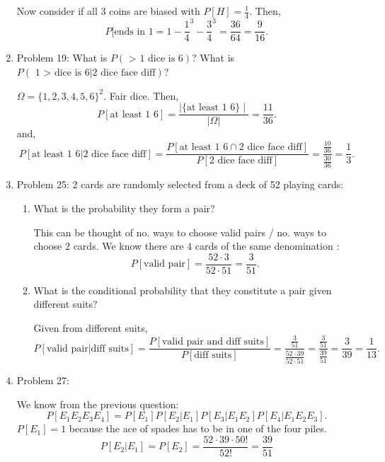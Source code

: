 \documentclass[a4paper]{article}
\begin{document}
\begin{enumerate}
\begin{note}
      Now consider if all 3 coins are biased with  $P[H] = \frac{1}{4}$. Then,
      \[
        P[\text{ends in 1} = 1 - \frac{1}{4}^{3} - \frac{3}{4}^{3} = \frac{36}{64} = \frac{9}{16}
      .\] 
    \end{note}
  \item Problem 19: What is $P(\text{ > 1 dice is 6})$? What is  $P(\text{ 1 > dice is 6} | \text{2 dice face diff})$?
    \begin{note}
      $\Omega = \{1,2,3,4,5,6\}^{2}$. Fair dice. Then,
      \[
        P[\text{at least 1 6}] = \frac{\mid \{\text{at least 1 6} \}\mid }{|\Omega|} = \frac{11}{36}
      .\] 
      and,
      \[
        P[\text{at least 1 6} | \text{2 dice face diff}] = \frac{P[\text{at least 1 6} \cap \text{2 dice face diff}]}{
        P[\text{2 dice face diff}]} = \frac{\frac{10}{36}}{\frac{30}{36}} = \frac{1}{3}
      .\] 
    \end{note}
  \item Problem 25: 2 cards are randomly selected from a deck of 52 playing cards:
    \begin{enumerate}
      \item What is the probability they form a pair?
        \begin{note}
          This can be thought of no. ways to choose valid pairs / no. ways to choose 2 cards. We know there 
          are $4$ cards of the same denomination :
          \[
            P[\text{valid pair}] = \frac{52 \cdot 3}{52 \cdot 51} = \frac{3}{51}
          .\] 
        \end{note}
      \item What is the conditional probability that they constitute a pair given different suits?
        \begin{note}
          Given from different suits,
          \[
            P[\text{valid pair} | \text{diff suits}] = \frac{P[\text{valid pair and diff suits}]}{P[\text{diff suits}]} 
            = \frac{\frac{3}{51}}{\frac{52 \cdot 39}{52 \cdot 51}} = \frac{\frac{3}{51}}{\frac{39}{51}} = \frac{3}{39} = \frac{1}{13}
          .\] 
        \end{note}
    \end{enumerate}
  \item Problem 27:
    \begin{note}
      We know from the previous question:
      \[
        P[E_1 E_2 E_3 E_4] = P[E_1] P[E_2|E_1] P[E_3|E_1 E_2] P[E_4 | E_1 E_2 E_3]
      .\] 
      $P[E_1]=1$ because the ace of spades has to be in one of the four piles.  
       \[
         P[E_2|E_1] = P[E_2] = \frac{52 \cdot 39 \cdot 50!}{52!} = \frac{39}{51} 
\]
\end{note}
\end{enumerate}
\end{document}
